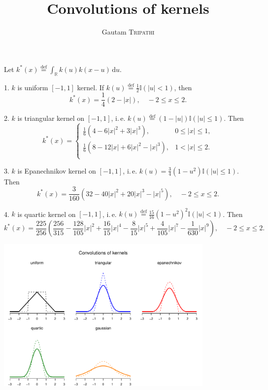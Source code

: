 \documentclass[11pt, a4paper]{article}
\author{Gautam \textsc{Tripathi}}
\title{Convolutions of kernels}
\newcommand{\ind}{\mathbb{I}}
\newcommand{\eqdef}{\mathrel{\stackrel{\text{def}}=}}
\newcommand{\ddd}{\mathrm{d}}
\begin{document}
	
\maketitle
\thispagestyle{empty}


Let $k^*(x) \eqdef \int_{\mathbb{R}} k(u) k(x-u)\,\ddd u$.

1. $k$ is uniform $[-1,1]$ kernel. If $k(u)\eqdef \frac12\ind(|u|<1)$, then
\[
k^*(x) = \frac14 (2-|x|), \quad -2\le x \le 2.
\]

2. $k$ is triangular kernel on $[-1,1]$, i.\,e. $k(u) \eqdef (1-|u|) \ind(|u|\le 1)$. Then
\[
k^*(x) = \begin{cases}
\frac16 (4 - 6 |x|^2+ 3 |x|^3 ), & 0\le |x| \le 1,  \\
\frac16 (8 - 12|x| + 6|x|^2 - |x|^3), & 1 < |x| \le 2. \\
\end{cases}
\]

3. $k$ is Epanechnikov kernel on $[-1,1]$, i.\,e. $k(u) = \frac34 (1-u^2) \ind(|u|\le1)$. Then
\[
k^*(x) = \frac{3}{160} (32 - 40 |x|^2 + 20 |x|^3 - |x|^5), \quad -2 \le x \le 2.
\]

4. $k$ is quartic kernel on $[-1,1]$, i.\,e. $k(u)\eqdef \frac{15}{16} (1-u^2)^2 \ind(|u|<1)$. Then
\[
k^*(x) = \frac{225}{256} \left(\frac{256}{315} -\frac{128}{105} |x|^2 + \frac{16}{15} |x|^4 - \frac{8}{15} |x|^5+ \frac{4}{105} |x|^7 - \frac{1}{630} |x|^9 \right), \quad  -2 \le x \le 2.
\]

\vfill

\centering
\includegraphics[width=0.8\textwidth]{output/12-convolutions.pdf}
\end{document}
